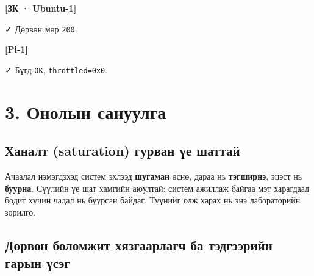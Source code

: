 \textbf{{[}ЗК · Ubuntu-1{]}}

\begin{Shaded}
\begin{Highlighting}[]
\KeywordTok{\&\&} \KeywordTok{\&\&} 
\end{Highlighting}
\end{Shaded}

✓ Дөрвөн мөр \texttt{200}.

\textbf{{[}Pi-1{]}}

\begin{Shaded}
\begin{Highlighting}[]
\KeywordTok{\&\&} \KeywordTok{\&\&} \KeywordTok{\&\&} 
\end{Highlighting}
\end{Shaded}

✓ Бүгд \texttt{OK}, \texttt{throttled=0x0}.

\hypertarget{ux43eux43dux43eux43bux44bux43d-ux441ux430ux43dux443ux443ux43bux433ux430}{%
\section{3. Онолын сануулга}\label{ux43eux43dux43eux43bux44bux43d-ux441ux430ux43dux443ux443ux43bux433ux430}}

\hypertarget{ux445ux430ux43dux430ux43bux442-saturation-ux433ux443ux440ux432ux430ux43d-ux4afux435-ux448ux430ux442ux442ux430ux439}{%
\subsection{Ханалт (saturation) гурван үе шаттай}\label{ux445ux430ux43dux430ux43bux442-saturation-ux433ux443ux440ux432ux430ux43d-ux4afux435-ux448ux430ux442ux442ux430ux439}}

Ачаалал нэмэгдэхэд систем эхлээд \textbf{шугаман} өснө, дараа нь \textbf{тэгширнэ}, эцэст нь \textbf{буурна}. Сүүлийн үе шат хамгийн аюултай: систем ажиллаж байгаа мэт харагдаад бодит хүчин чадал нь буурсан байдаг. Түүнийг олж харах нь энэ лабораторийн зорилго.

\hypertarget{ux434ux4e9ux440ux432ux4e9ux43d-ux431ux43eux43bux43eux43cux436ux438ux442-ux445ux44fux437ux433ux430ux430ux440ux43bux430ux433ux447-ux431ux430-ux442ux44dux434ux433ux44dux44dux440ux438ux439ux43d-ux433ux430ux440ux44bux43d-ux4afux441ux44dux433}{%
\subsection{Дөрвөн боломжит хязгаарлагч ба тэдгээрийн гарын үсэг}\label{ux434ux4e9ux440ux432ux4e9ux43d-ux431ux43eux43bux43eux43cux436ux438ux442-ux445ux44fux437ux433ux430ux430ux440ux43bux430ux433ux447-ux431ux430-ux442ux44dux434ux433ux44dux44dux440ux438ux439ux43d-ux433ux430ux440ux44bux43d-ux4afux441ux44dux433}}

